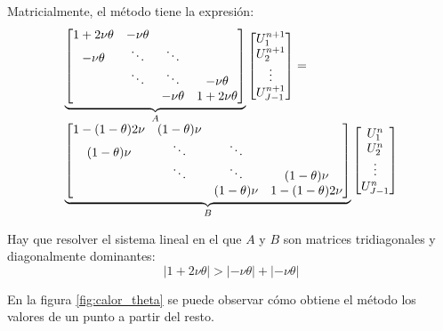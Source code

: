 Matricialmente, el método tiene la expresión:
\begin{equation*}
	\begin{array}{l l l}
		\underbrace{
		\begin{bmatrix}
			1+2\nu\theta & -\nu\theta &        & \\
			-\nu\theta   & \ddots     & \ddots & \\
			& \ddots     & \ddots     & -\nu\theta\\
			&            & -\nu\theta & 1+2\nu\theta\\
		\end{bmatrix}}_A
		\begin{bmatrix}
			U_1^{n+1}\\
			U_2^{n+1}\\
			\vdots\\
			U_{J-1}^{n+1}\\
		\end{bmatrix}
		=\\
		\underbrace{
		\begin{bmatrix}
			1-(1-\theta)2\nu         & (1-\theta)\nu&        & \\
			(1-\theta)\nu            & \ddots       & \ddots & \\
			& \ddots & \ddots        & (1-\theta)\nu\\
			&        & (1-\theta)\nu & 1-(1-\theta)2\nu\\
		\end{bmatrix}}_B
			\begin{bmatrix}
				U_1^{n}\\
				U_2^{n}\\
				\vdots\\
				U_{J-1}^{n}\\
			\end{bmatrix}
	\end{array}
	\end{equation*}
	
	Hay que resolver el sistema lineal en el que $A$ y $B$ son matrices tridiagonales y diagonalmente dominantes:
	$$|1+2\nu\theta| > |-\nu\theta| + |-\nu\theta|$$
	
	En la figura \ref{fig:calor_theta} se puede observar cómo obtiene el método los valores de un punto a partir del resto.
	
